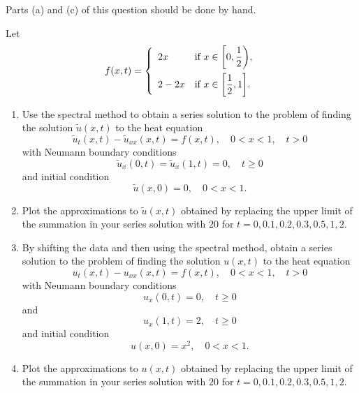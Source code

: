 Parts (a) and (c) of this question should be done by hand.

Let
\[
f(x,t)=\left\{\begin{array}{ll}
2x & \displaystyle{\mbox{if }x\in\left[0,{1 \over 2}\right)},
\\[10pt]
2-2x & \displaystyle{\mbox{if }x\in\left[{1 \over 2},1\right]}.
\end{array}\right.
\]
\begin{enumerate}
\item Use the spectral method to obtain a series solution to the problem of finding the solution $\tilde{u}(x,t)$ to the heat equation
\[
\tilde{u}_t(x,t)-\tilde{u}_{xx}(x,t) = f(x,t),\quad 0<x<1,\quad t>0
\]
with Neumann boundary conditions
\[
\tilde{u}_x(0,t) = \tilde{u}_x(1,t) = 0,\quad t\ge0
\]
and initial condition
\[
\tilde{u}(x,0)=0,\quad 0<x<1.
\]

\item Plot the approximations to $\tilde{u}(x,t)$ obtained by replacing the upper limit of the summation in your series solution with $20$ for $t=0,0.1,0.2,0.3,0.5,1,2$.

\item By shifting the data and then using the spectral method, obtain a series solution to the problem of finding the solution $u(x,t)$ to the heat equation
\[
u_t(x,t)-u_{xx}(x,t) = f(x,t),\quad 0<x<1,\quad t>0
\]
with Neumann boundary conditions
\[
u_x(0,t) =0,\quad t\ge0
\]
and
\[
u_x(1,t) = 2,\quad t\ge0
\]
and initial condition
\[
u(x,0)=x^2,\quad 0<x<1.
\]

\item Plot the approximations to $u(x,t)$ obtained by replacing the upper limit of the summation in your series solution with $20$ for $t=0,0.1,0.2,0.3,0.5,1,2$.
\end{enumerate}


